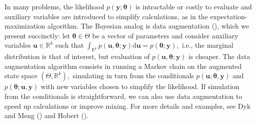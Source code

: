 \documentclass[
  11pt,
  letterpaper,
]{scrbook}
\theoremstyle{definition}
\theoremstyle{plain}
\theoremstyle{plain}
\theoremstyle{plain}
\theoremstyle{definition}
\theoremstyle{definition}
\theoremstyle{plain}
\theoremstyle{plain}
\theoremstyle{remark}
\begin{document}
In many problems, the likelihood
\(p(\boldsymbol{y}; \boldsymbol{\theta})\) is intractable or costly to
evaluate and auxiliary variables are introduced to simplify
calculations, as in the expectation-maximization algorithm. The Bayesian
analog is data augmentation (), which we present succinctly: let
\(\boldsymbol{\theta} \in \Theta\) be a vector of parameters and
consider auxiliary variables \(\boldsymbol{u} \in \mathbb{R}^k\) such
that
\(\int_{\mathbb{R}^k} p(\boldsymbol{u}, \boldsymbol{\theta}; \boldsymbol{y}) \mathrm{d} \boldsymbol{u} = p(\boldsymbol{\theta}; \boldsymbol{y}),\)
i.e., the marginal distribution is that of interest, but evaluation of
\(p(\boldsymbol{u}, \boldsymbol{\theta}; \boldsymbol{y})\) is cheaper.
The data augmentation algorithm consists in running a Markov chain on
the augmented state space \((\Theta, \mathbb{R}^k),\) simulating in turn
from the conditionals
\(p(\boldsymbol{u}; \boldsymbol{\theta}, \boldsymbol{y})\) and
\(p(\boldsymbol{\theta}; \boldsymbol{u}, \boldsymbol{y})\) with new
variables chosen to simplify the likelihood. If simulation from the
conditionals is straightforward, we can also use data augmentation to
speed up calculations or improve mixing. For more details and examples,
see Dyk and Meng () and Hobert
().
\end{document}
